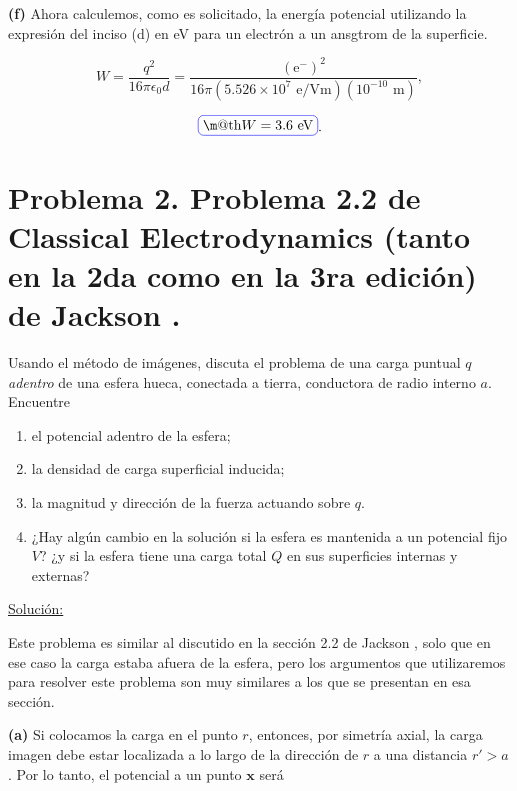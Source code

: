 \documentclass[a4paper,10pt]{article}
\makeatletter
\numberwithin{equation}{section}
\newcommand*{\boxcolor}{blue}
\renewcommand{\boxed}[1]{\textcolor{\boxcolor}{%
\tikz[baseline={([yshift=-1ex]current bounding box.center)}] \node [rectangle, minimum width=1ex,rounded corners,draw] {\normalcolor\m@th$\displaystyle#1$};}}
\makeatother
\begin{document}
\textbf{(f)} Ahora calculemos, como es solicitado, la energía potencial utilizando 
la expresión del inciso (d) en eV para un electrón a un ansgtrom de la superficie.

\begin{equation}
 W = \frac{q^2}{16\pi\epsilon_0d} = \frac{(\text{e}^-)^2}{16\pi(5.526\times 10^7 \text{ e/Vm})
 (10^{-10}\text{ m})},
\end{equation}

\begin{equation}
 \boxed{W = 3.6 \text{ eV}}.
\end{equation}

\section{Problema 2. Problema 2.2 de Classical Electrodynamics (tanto en la 2da 
como en la 3ra edición) de Jackson \cite{jackson2,jackson3}.}

Usando el método de imágenes, discuta el problema de una carga puntual $q$ 
\emph{adentro} de una esfera hueca, conectada a tierra, conductora de radio interno
$a$. Encuentre 

\begin{enumerate}[label=\textbf{(\alph*)}]
 \item el potencial adentro de la esfera;
 \item la densidad de carga superficial inducida;
 \item la magnitud y dirección de la fuerza actuando sobre $q$.
 \item ¿Hay algún cambio en la solución si la esfera es mantenida a un potencial 
 fijo $V$? ¿y si la esfera tiene una carga total $Q$ en sus superficies internas y 
 externas?
\end{enumerate}

\vspace{.3cm}

\underline{Solución:} \vspace{.3cm}

Este problema es similar al discutido en la sección 2.2 de Jackson \cite{jackson3}, 
solo que en ese caso la carga estaba afuera de la esfera, pero los argumentos que 
utilizaremos para resolver este problema son muy similares a los que se presentan 
en esa sección. 

\vspace{.3cm}

\textbf{(a)} Si colocamos la carga en el punto $r$, entonces, por 
simetría axial, la carga imagen debe estar localizada a lo largo de la dirección 
de $r$ a una distancia $r' > a$. Por lo tanto, el potencial a un punto $\mathbf{x}$ será 
\end{document}

